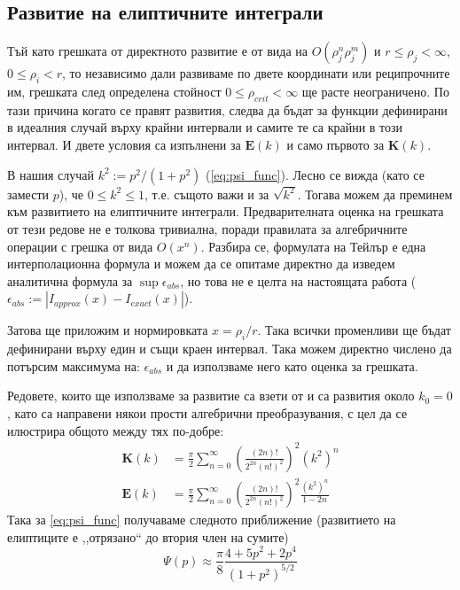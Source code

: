 \subsection{Развитие на елиптичните интеграли}
Тъй като грешката от директното развитие е от вида на $O(\rho_j^n \rho_j^m)$ и $r \le \rho_j < \infty$, $0 \le \rho_i < r$, то независимо дали развиваме по двете координати или
реципрочните им, грешката след определена стойност $0 \le \rho_{crit} < \infty$ ще расте неограничено. По тази причина когато се правят развития, следва да бъдат за функции дефинирани
в идеалния случай върху крайни интервали и самите те са крайни в този интервал. И двете условия са изпълнени за $\boldsymbol{E}(k)$ и само първото за $\boldsymbol{K}(k)$. 

В нашия случай $k^2 := p^2/(1+p^2)$ (\autoref{eq:psi_func}). Лесно се вижда (като се замести $p$), че $ 0 \le k^2 \le 1$, т.е. същото важи и за $\sqrt{k^2}$. Тогава можем да преминем към развитието
на елиптичните интеграли. Предварителната оценка на грешката от тези редове не е толкова тривиална, поради правилата за алгебричните операции с грешка от вида $O(x^n)$. Разбира се, формулата на Тейлър е една интерполационна формула и можем да се опитаме директно да изведем 
аналитична формула за $\sup\epsilon_{abs}$, но това не е целта на настоящата работа ($\epsilon_{abs} := |I_{approx}(x) - I_{exact}(x)|$).

Затова ще приложим и нормировката $x = \rho_i/r$. Така всички променливи ще бъдат дефинирани върху един и същи краен интервал. Така можем директно числено да потърсим максимума на: $\epsilon_{abs}$ и да използваме
него като оценка за грешката. 

Редовете, които ще използваме за развитие са взети от \cite{gradshteyn} и са развития около $k_0 = 0$ , като са направени някои прости алгебрични преобразувания, с цел да се илюстрира общото между тях по-добре:
\begin{align*}
	\boldsymbol{K}(k) & =\frac{\pi}{2}   \sum _{n=0}^{\infty } \left(\frac{(2 n)!}{2^{2 n} (n!)^2}\right)^2 \left(k^2\right)^n               \\
	\boldsymbol{E}(k) & =\frac{\pi}{2}   \sum _{n=0}^{\infty } \left(\frac{(2 n)!}{2^{2 n} (n!)^2}\right)^2 \frac{\left(k^2\right)^n}{1-2 n} 
\end{align*}	
Така за \autoref{eq:psi_func} получаваме следното приближение (развитието на елиптиците е ,,отрязано`` до втория член на сумите)
\begin{equation}
	\Psi(p) \approx \frac{\pi}{8} \frac{4+5p^2+2p^4}{(1+p^2)^{5/2}}
	\label{eq:psi_approximation}
\end{equation}


